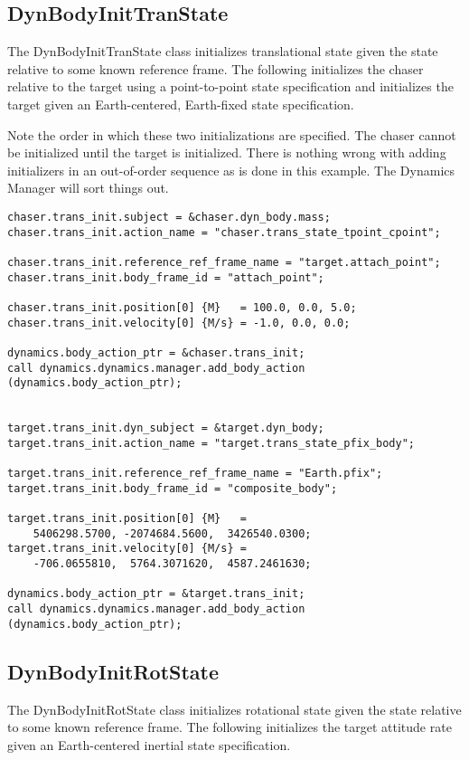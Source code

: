 \subsection{DynBodyInitTranState}
The DynBodyInitTranState class initializes translational state
given the state relative to some known reference frame.
The following initializes the chaser relative to the target
using a point-to-point state specification
and initializes the target given an Earth-centered, Earth-fixed
state specification.

Note the order in which these two initializations are specified.
The chaser cannot be initialized until the target is initialized.
There is nothing wrong with adding initializers in an out-of-order
sequence as is done in this example. The Dynamics Manager will
sort things out.

\begin{verbatim}
chaser.trans_init.subject = &chaser.dyn_body.mass;
chaser.trans_init.action_name = "chaser.trans_state_tpoint_cpoint";

chaser.trans_init.reference_ref_frame_name = "target.attach_point";
chaser.trans_init.body_frame_id = "attach_point";

chaser.trans_init.position[0] {M}   = 100.0, 0.0, 5.0;
chaser.trans_init.velocity[0] {M/s} = -1.0, 0.0, 0.0;

dynamics.body_action_ptr = &chaser.trans_init;
call dynamics.dynamics.manager.add_body_action (dynamics.body_action_ptr);


target.trans_init.dyn_subject = &target.dyn_body;
target.trans_init.action_name = "target.trans_state_pfix_body";

target.trans_init.reference_ref_frame_name = "Earth.pfix";
target.trans_init.body_frame_id = "composite_body";

target.trans_init.position[0] {M}   =
    5406298.5700, -2074684.5600,  3426540.0300;
target.trans_init.velocity[0] {M/s} =
    -706.0655810,  5764.3071620,  4587.2461630;

dynamics.body_action_ptr = &target.trans_init;
call dynamics.dynamics.manager.add_body_action (dynamics.body_action_ptr);
\end{verbatim}

\subsection{DynBodyInitRotState}
The DynBodyInitRotState class initializes rotational state
given the state relative to some known reference frame.
The following initializes the target attitude rate
given an Earth-centered inertial state specification.

